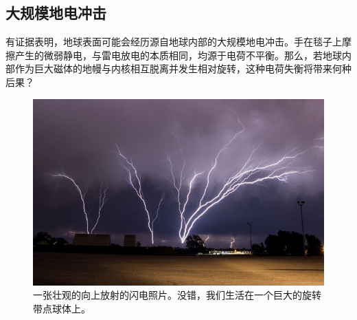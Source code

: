 \documentclass[10pt,twocolumn,letterpaper]{article}
\begin{document}
\subsection{大规模地电冲击}

有证据表明，地球表面可能会经历源自地球内部的大规模地电冲击。手在毯子上摩擦产生的微弱静电，与雷电放电的本质相同，均源于电荷不平衡。那么，若地球内部作为巨大磁体的地幔与内核相互脱离并发生相对旋转，这种电荷失衡将带来何种后果？

\begin{figure}[t]
\begin{center}
   \includegraphics[width=1\linewidth]{lightning.jpg}
\end{center}
   \caption{一张壮观的向上放射的闪电照片。没错，我们生活在一个巨大的旋转带点球体上。 \cite{22}}
\label{fig:7}
\label{fig:onecol}
\end{figure}
\end{document}

